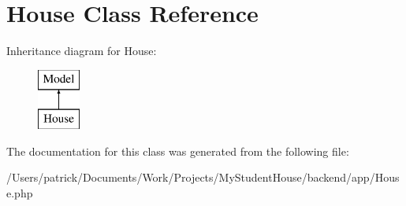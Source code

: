 \hypertarget{class_app_1_1_house}{}\section{House Class Reference}
\label{class_app_1_1_house}
Inheritance diagram for House\+:\begin{figure}[H]
\begin{center}
\leavevmode
\includegraphics[height=2.000000cm]{class_app_1_1_house}
\end{center}
\end{figure}


The documentation for this class was generated from the following file\+:\begin{DoxyCompactItemize}
\item 
/\+Users/patrick/\+Documents/\+Work/\+Projects/\+My\+Student\+House/backend/app/House.\+php\end{DoxyCompactItemize}
